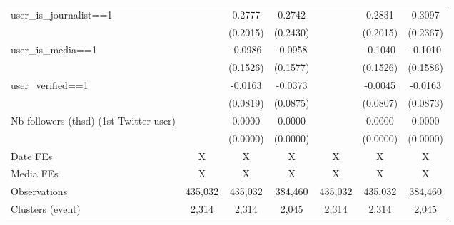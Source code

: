 {\begin{tabular}{l*{6}{c}}
user\_is\_journalist==1&                     &      0.2777         &      0.2742         &                     &      0.2831         &      0.3097         \\
                    &                     &    (0.2015)         &    (0.2430)         &                     &    (0.2015)         &    (0.2367)         \\
user\_is\_media==1    &                     &     -0.0986         &     -0.0958         &                     &     -0.1040         &     -0.1010         \\
                    &                     &    (0.1526)         &    (0.1577)         &                     &    (0.1526)         &    (0.1586)         \\
user\_verified==1    &                     &     -0.0163         &     -0.0373         &                     &     -0.0045         &     -0.0163         \\
                    &                     &    (0.0819)         &    (0.0875)         &                     &    (0.0807)         &    (0.0873)         \\
Nb followers (thsd) (1st Twitter user)&                     &      0.0000         &      0.0000         &                     &      0.0000         &      0.0000         \\
                    &                     &    (0.0000)         &    (0.0000)         &                     &    (0.0000)         &    (0.0000)         \\
\hline
Date FEs            &           X         &           X         &           X         &           X         &           X         &           X         \\
Media FEs           &           X         &           X         &           X         &           X         &           X         &           X         \\
Observations        &     435,032         &     435,032         &     384,460         &     435,032         &     435,032         &     384,460         \\
Clusters (event)    &       2,314         &       2,314         &       2,045         &       2,314         &       2,314         &       2,045         \\
\hline\hline
\end{tabular}
}
